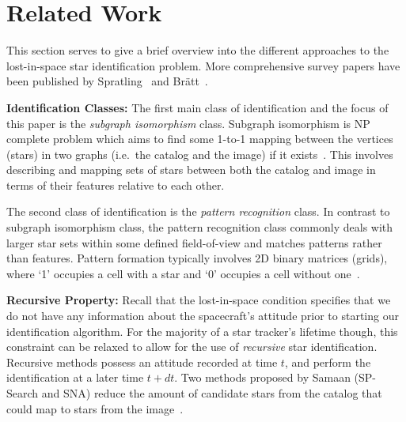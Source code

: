 \newcommand{\nsubparagraph}[1]{\textbf{#1}}

\section{Related Work}\label{sec:relatedWork}
This section serves to give a brief overview into the different approaches to the lost-in-space star identification
problem.
More comprehensive survey papers have been published by Spratling~\cite{spratling:surveyStarIdentification} and
Br\"{a}tt~\cite{bratt:analysisStarIdentification}.

\nsubparagraph{Identification Classes:}
The first main class of identification and the focus of this paper is the \textit{subgraph isomorphism} class.
Subgraph isomorphism is NP complete problem which aims to find some 1-to-1 mapping between the vertices (stars) in two
graphs (i.e.\ the catalog and the image) if it exists~\cite{scott:graphIsomorphismProblem}.
This involves describing and mapping sets of stars between both the catalog and image in terms of their features
relative to each other.

The second class of identification is the \textit{pattern recognition} class.
In contrast to subgraph isomorphism class, the pattern recognition class commonly deals with larger star sets within
some defined field-of-view and matches patterns rather than features.
Pattern formation typically involves 2D binary matrices (grids), where `1' occupies a cell with a star and `0' occupies
a cell without one~\cite{padgett:gridAlgorithm}.

%
%
%

\nsubparagraph{Recursive Property:}
Recall that the lost-in-space condition specifies that we do not have any information about the spacecraft's attitude
prior to starting our identification algorithm.
For the majority of a star tracker's lifetime though, this constraint can be relaxed to allow for the use of
\textit{recursive} star identification.
Recursive methods possess an attitude recorded at time $t$, and perform the identification at a later time $t + dt$.
Two methods proposed by Samaan (SP-Search and SNA) reduce the amount of candidate stars from the catalog that could
map to stars from the image~\cite{samaan:recursiveMode}.

